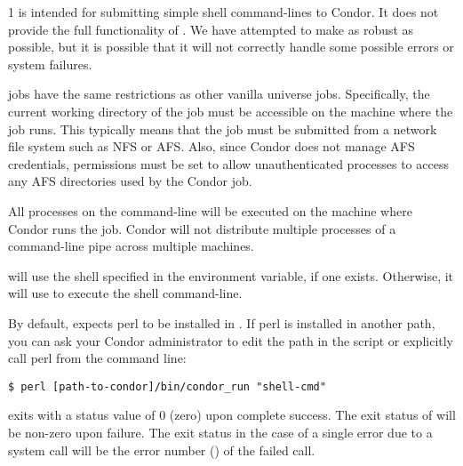 \begin{ManPage}{\label{man-condor-run}}{1}
 is intended for submitting simple shell command-lines to
Condor.  It does not provide the full functionality of
.  We have attempted to make  as robust as
possible, but it is possible that it will not correctly handle some
possible  errors or system failures.

 jobs have the same restrictions as other vanilla universe
jobs.  Specifically, the current working directory of the job must be
accessible on the machine where the job runs.  This typically means
that the job must be submitted from a network file system such as NFS
or AFS.  Also, since Condor does not manage AFS credentials,
permissions must be set to allow unauthenticated processes to access
any AFS directories used by the Condor job.

All processes on the command-line will be executed on the machine
where Condor runs the job.  Condor will not distribute multiple
processes of a command-line pipe across multiple machines.

 will use the shell specified in the  environment
variable, if one exists.  Otherwise, it will use  to execute
the shell command-line.

By default,  expects perl to be installed in
.  If perl is installed in another path, you can
ask your Condor administrator to edit the path in the 
script or explicitly call perl from the command line:

\begin{verbatim}
$ perl [path-to-condor]/bin/condor_run "shell-cmd"
\end{verbatim}

\ExitStatus

 exits with a status value of 0 (zero) upon complete success.
The exit status of  will be non-zero upon failure.
The exit status in the case of a single error due to a system call
will be the error number () of the failed call.

\end{ManPage}
